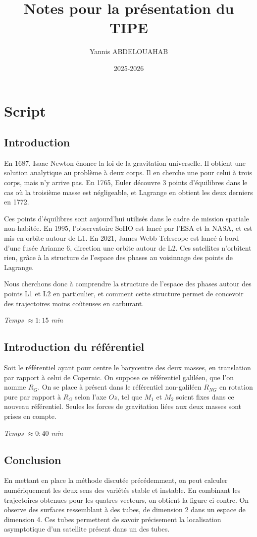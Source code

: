 \documentclass[12pt]{article}
\title{Notes pour la présentation du TIPE}
\author{Yannis ABDELOUAHAB}
\date{2025-2026}
\begin{document}
	
	\section*{Script}
	\subsection{Introduction}
	En 1687, Isaac Newton énonce la loi de la gravitation universelle. Il obtient une solution analytique au problème à deux corps. Il en cherche une pour celui à trois corps, mais n'y arrive pas. En 1765, Euler découvre 3 points d'équilibres dans le cas où la troisième masse est négligeable, et Lagrange en obtient les deux derniers en 1772.
	
	Ces points d'équilibres sont aujourd'hui utilisés dans le cadre de mission spatiale non-habitée. En 1995, l'observatoire SoHO est lancé par l'ESA et la NASA, et est mis en orbite autour de L1. En 2021, James Webb Telescope est lancé à bord d'une fusée Arianne 6, direction une orbite autour de L2. Ces satellites n'orbitent rien, grâce à la structure de l'espace des phases au voisinnage des points de Lagrange.
	
	Nous cherchons donc à comprendre la structure de l'espace des phases autour des points L1 et L2 en particulier, et comment cette structure permet de concevoir des trajectoires moins coûteuses en carburant.
	
	\bigskip
	
	\textit{Temps $\approx1:15$ min}
	
	\subsection{Introduction du référentiel}
	Soit le référentiel ayant pour centre le barycentre des deux masses, en translation par rapport à celui de Copernic. On suppose ce référentiel galiléen, que l'on nomme $R_G$. On se place à présent dans le référentiel non-galiléen $R_{NG}$ en rotation pure par rapport à $R_G$ selon l'axe $Oz$, tel que $M_1$ et $M_2$ soient fixes dans ce nouveau référentiel. Seules les forces de gravitation liées aux deux masses sont prises en compte.
	
	\bigskip
	
	\textit{Temps $\approx 0:40$ min}
	
	\subsection{Conclusion}
	En mettant en place la méthode discutée précédemment, on peut calculer numériquement les deux sens des variétés stable et instable. En combinant les trajectoires obtenues pour les quatres vecteurs, on obtient la figure ci-contre. On observe des surfaces ressemblant à des tubes, de dimension 2 dans un espace de dimension 4. Ces tubes permettent de savoir précisement la localisation asymptotique d'un satellite présent dans un des tubes.
	
\end{document}
